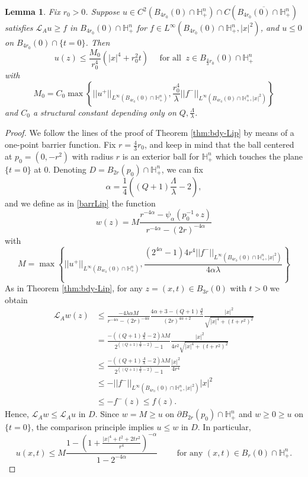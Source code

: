 \documentclass[12pt]{amsart}
\newtheorem{Lemma}[Theorem]{Lemma}
\def \H {{\mathbb H}}
\def \L {\mathcal{L}}
\def \a {\alpha}
\begin{document}
\begin{Lemma}\label{lemprimogiro}
Fix $r_0>0$. Suppose $u\in C^2(B_{4r_0}(0)\cap\H^n_+)\cap C(\overline{B_{4r_0}(0)\cap\H^n_+})$ satisfies $\L_A u \geq f$ in $B_{4r_0}(0)\cap\H^n_+$ for $f \in L^{\infty}(B_{4r_0}(0)\cap\H^n_+,|x|^2)$, and $u \leq 0$ on $B_{4r_0}(0) \cap \{t=0\}$. Then
$$u(z) \leq \frac{M_0}{r_0^4} \left(|x|^4+r_0^2 t \right) \quad \text{ for all } \ z \in B_{\frac{4}{3}r_0}(0)\cap \H^n_+$$
with
$$M_0=C_0\max\left\{ ||u^+||_{L^{\infty}(B_{4r_0}(0)\cap\H^n_+)}, 
\frac{r_0^4}{\lambda}||f^-||_{L^{\infty}(B_{4r_0}(0)\cap\H^n_+,|x|^2)}\right\}$$
and $C_0$ a structural constant depending only on $Q, \frac{\Lambda}{\lambda}$.
\end{Lemma}
\begin{proof}
We follow the lines of the proof of  Theorem \ref{thm:bdy-Lip} by means of a one-point barrier function. Fix $r=\frac{4}{3}r_0$, and keep in mind that the ball centered at $p_0=(0,-r^2)$ with radius $r$ is an exterior ball for $\H^n_+$ which touches the plane $\{t=0\}$ at $0$. Denoting $D=B_{2r}(p_0)\cap \H^n_+$, we can fix
$$
\a=\frac{1}{4}\left( (Q+1)\frac{\Lambda}{\lambda} - 2\right),
$$
and we define as in \eqref{barrLip} the function
$$
w(z)=M \frac{r^{-4\a}-\psi_\a(p_0^{-1}\circ z)}{r^{-4\a}-(2 r)^{-4\a}}
$$
with 
$$
M=\max\left\{ ||u^+||_{L^{\infty}(B_{4r_0}(0)\cap\H^n_+)}, 
\frac{(2^{4\a}-1)4r^4||f^-||_{L^{\infty}(B_{4r_0}(0)\cap\H^n_+,|x|^2)}}{4\a\lambda}\right\}
$$
As in Theorem \ref{thm:bdy-Lip}, for any $z=(x,t)\in B_{3r}(0)$ with $t>0$ we obtain 
\begin{align*}
\L_A w (z) &\leq \frac{-4\lambda \a M}{r^{-4\a}-(2 r)^{-4\a}} \frac{ 4\a + 3 - (Q+1)\frac{\Lambda}{\lambda}}{(2 r)^{4\a+2}}\frac{|x|^2}{\sqrt{|x|^4+(t+r^2)^2}}\\
&=\frac{-\left( (Q+1)\frac{\Lambda}{\lambda} - 2\right)\lambda M}{2^{\left( (Q+1)\frac{\Lambda}{\lambda} - 2\right)}-1} \frac{|x|^2}{4r^2\sqrt{|x|^4+(t+r^2)^2}}\\
&\leq \frac{-\left( (Q+1)\frac{\Lambda}{\lambda} - 2\right)\lambda M}{2^{\left( (Q+1)\frac{\Lambda}{\lambda} - 2\right)}-1} \frac{|x|^2}{4r^4} \\
& \leq - ||f^-||_{L^{\infty}(B_{4r_0}(0)\cap\H^n_+,|x|^2)} |x|^2\\
&\leq -f^-(z)\leq f(z).
\end{align*}
Hence, $\L_A w \leq \L_A u$ in $D$. Since $w=M\geq u$ on $\partial B_{2r}(p_0)\cap \H^n_+$ and $w\geq 0\geq u$ on $\{t=0\}$, the comparison principle implies $u\leq w$ in $D$. In particular,
$$
u(x,t)\leq M \frac{1-\left(1+\frac{|x|^4+t^2+2tr^2}{r^4}\right)^{-\alpha}}{1-2^{-4\a}}\qquad\mbox{ for any }(x,t)\in B_r(0)\cap \H^n_+.
$$
\end{proof}
\end{document}

